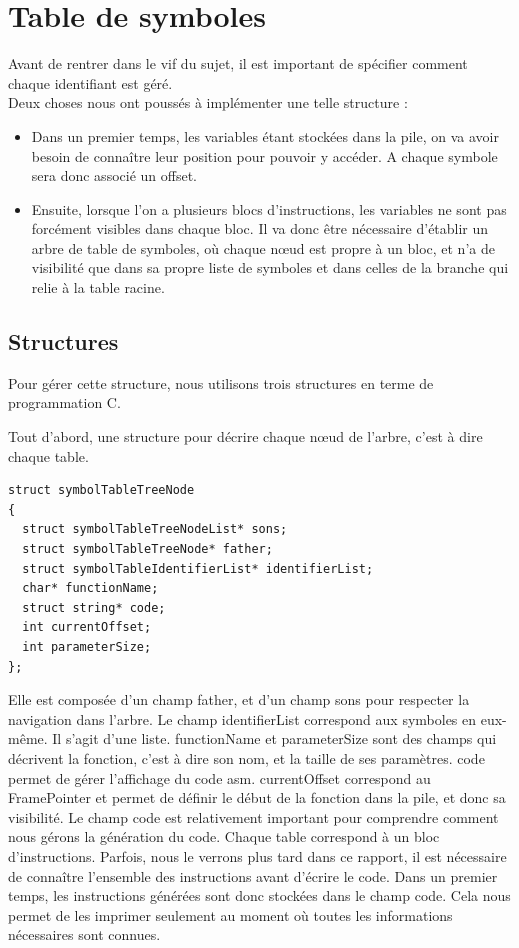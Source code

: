 \section{Table de symboles}

Avant de rentrer dans le vif du sujet, il est important de spécifier comment chaque identifiant est géré.\\ Deux choses nous ont poussés à implémenter une telle structure :
\begin{itemize}
\item Dans un premier temps, les variables étant stockées dans la pile, on va avoir besoin de connaître leur position pour pouvoir y accéder. A chaque symbole sera donc associé un offset.
\item Ensuite, lorsque l'on a plusieurs blocs d'instructions, les variables ne sont pas forcément visibles dans chaque bloc. Il va donc être nécessaire d'établir un arbre de table de symboles, où chaque n\oe{}ud est propre à un bloc, et n'a de visibilité que dans sa propre liste de symboles et dans celles de la branche qui relie à la table racine.
\end{itemize}


\subsection*{Structures}

Pour gérer cette structure, nous utilisons trois structures en terme de programmation C.

Tout d'abord, une structure pour décrire chaque n\oe{}ud de l'arbre, c'est à dire chaque table. 

\begin{verbatim}
struct symbolTableTreeNode
{
  struct symbolTableTreeNodeList* sons;
  struct symbolTableTreeNode* father;
  struct symbolTableIdentifierList* identifierList;
  char* functionName;
  struct string* code;
  int currentOffset;
  int parameterSize;
};
\end{verbatim} 

Elle est composée d'un champ father, et d'un champ sons pour respecter la navigation dans l'arbre. 
Le champ identifierList correspond aux symboles en eux-même. Il s'agit d'une liste. 
functionName et parameterSize sont des champs qui décrivent la fonction, c'est à dire son nom, et la taille de ses paramètres.
code permet de gérer l'affichage du code asm.
currentOffset correspond au FramePointer et permet de définir le début de la fonction dans la pile, et donc sa visibilité.
Le champ code est relativement important pour comprendre comment nous gérons la génération du code. Chaque table correspond à un bloc d'instructions. Parfois, nous le verrons plus tard dans ce rapport, il est nécessaire de connaître l'ensemble des instructions avant d'écrire le code. Dans un premier temps, les instructions générées sont donc stockées dans le champ code. Cela nous permet de les imprimer seulement au moment où toutes les informations nécessaires sont connues.



